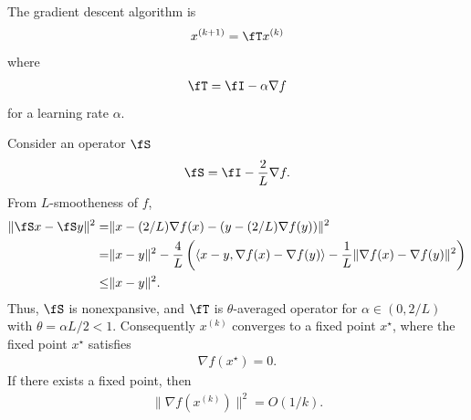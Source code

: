\documentclass{article}
\begin{document}
The gradient descent algorithm is
\begin{align}
    x^{(k+1)} = \fT x^{(k)}
\end{align}
where 
\begin{align}
    \fT = \fI - \alpha \nabla f
\end{align}
for a learning rate $\alpha$.

Consider an operator $\fS$
\begin{align}
    \fS = \fI - \frac{2}{L} \nabla f.
\end{align}
From $L$-smootheness of $f$,
\begin{align}
    \|\fS x - \fS y\|^2
    =& \|x - (2/L)\nabla f(x) - (y - (2/L)\nabla f(y))\|^2\\
    =& \|x-y\|^2 - \frac{4}{L} \left(\langle x-y, \nabla f(x) - \nabla f(y)\rangle -\frac{1}{L}\|\nabla f(x) - \nabla f(y)\|^2\right)\\
    \leq& \|x-y\|^2.
\end{align}
Thus, $\fS$ is nonexpansive, and $\fT$ is $\theta$-averaged operator for $\alpha\in(0, 2/L)$ with $\theta=\alpha L/2 < 1$.
Consequently $x^{(k)}$ converges to a fixed point $x^\star$, where the fixed point $x^\star$ satisfies
\begin{align}
    \nabla f(x^\star) = 0.
\end{align}
If there exists a fixed point, then
\begin{align}
    \|\nabla f(x^{(k)})\|^2 = O(1/k).
\end{align}
\end{document}
